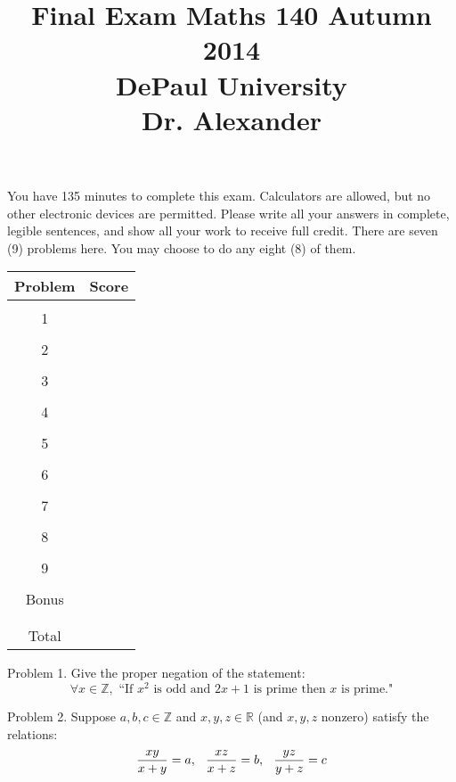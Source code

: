 \documentclass[16 pt]{amsart}
\theoremstyle{definition}
\theoremstyle{remark}
\numberwithin{equation}{subsection}
\newcommand{\R}{\mathbb{R}}
\newcommand{\Z}{\mathbb{Z}}
\begin{document}
\title{Final Exam Maths 140 Autumn 2014 \\ DePaul University\\Dr. Alexander}
\maketitle
You have 135 minutes to complete this exam.  Calculators are allowed, but no other electronic devices are permitted.  Please write all your answers in complete, legible sentences, and show all your work to receive full credit.  There are seven (9) problems here.  You may choose to do any eight (8) of them.  
\vspace{1in}


\begin{center}
  \begin{tabular}{ c | c }
    Problem & Score\\
    \hline
    &\\
    1&\\
    &\\
    2&\\
    &\\
    3&\\
    &\\
    4&\\
    &\\
    5&\\
    &\\
    6&\\
    &\\
    7&\\
    &\\
    8&\\
    &\\
    9&\\
    &\\
    Bonus&\\
    &\\
    \hline 
    &\\    
    Total& 
 \end{tabular}
\end{center}

\newpage 
Problem 1. Give the proper negation of the statement:
\[
\forall x\in \Z, \text{ ``If $x^2$ is odd and $2x+1$ is prime then $x$ is prime."}
\]





\newpage
Problem 2. Suppose $a,b,c\in\Z$ and $x,y,z\in\R$ (and $x,y,z$ nonzero) satisfy the relations:
\[
\frac{xy}{x+y} = a, \hspace{.1in} \frac{xz}{x+z} = b, \hspace{.1in}\frac{yz}{y+z} = c
\]  
\end{document}
